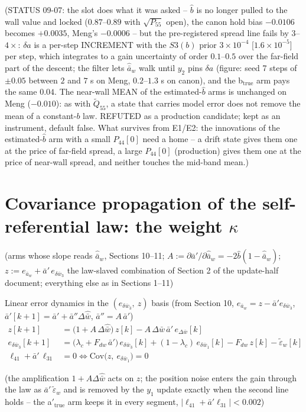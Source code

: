 \documentclass[11pt,a4paper,fontset=none]{ctexart}
\newcommand{\ba}{\bar{a}}
\newcommand{\bw}{\bar{w}}
\newcommand{\dWh}{\Delta\hat{\bw}}
\newcommand{\eD}{e_{\Delta\bw}}
\newcommand{\ap}{\ba'}
\newcommand{\app}{\ba''}
\newcommand{\et}{\tilde{\varepsilon}_w}
\begin{document}
(STATUS 09-07: the slot does what it was asked -- $\hat b$ is no longer pulled to the wall value and locked ($0.87$--$0.89$ with
$\sqrt{P_{55}}$ open), the canon hold bias $-0.0106$ becomes $+0.0035$, Meng's $-0.0006$ -- but the pre-registered spread line fails
by $3$--$4\times$: $\delta a$ is a per-step INCREMENT with the $S3(b)$ prior $3\times10^{-4}$ [$1.6\times10^{-5}$] per step, which integrates
to a gain uncertainty of order $0.1$--$0.5$ over the far-field part of the descent; the filter lets $\hat{\ba}_w$ walk until $y_2$ pins
$\delta a$ (figure: seed 7 steps of $\pm 0.05$ between $2$ and $7$ s on Meng, $0.2$--$1.3$ s on canon), and the b$_{\mathrm{true}}$ arm pays
the same $0.04$. The near-wall MEAN of the estimated-$\hat b$ arms is unchanged on Meng ($-0.010$): as with $\tilde Q_{55}$, a state
that carries model error does not remove the mean of a constant-$b$ law. REFUTED as a production candidate; kept as an instrument,
default false. What survives from E1/E2: the innovations of the estimated-$\hat b$ arm with a small $P_{44}[0]$ need a home -- a drift
state gives them one at the price of far-field spread, a large $P_{44}[0]$ (production) gives them one at the price of near-wall
spread, and neither touches the mid-band mean.)


\clearpage
\section{Covariance propagation of the self-referential law: the weight $\kappa$}

(arms whose slope reads $\hat{\ba}_w$, Sections 10--11; $A := \partial\ap/\partial\hat{\ba}_w = -2\hat{b}(1-\hat{\ba}_w)$;
$z := e_{\ba_w} + \ap\,e_{\delta\bw_3}$ the law-slaved combination of Section 2 of the update-half document;
everything else as in Sections 1--11)

Linear error dynamics in the $(e_{\delta\bw_3},\ z)$ basis (from Section 10, $e_{\ba_w} = z - \ap e_{\delta\bw_3}$, $\ap[k+1] = \ap + \app\dWh$, $\app = A\,\ap$)
\begin{align*}
z[k+1] &= \bigl(1 + A\,\dWh\bigr)\,z[k] - A\,\dWh\,\ap\,\eD[k] \\
e_{\delta\bw_3}[k+1] &= \bigl(\lambda_c + F_{dw}\,\ap\bigr)\,e_{\delta\bw_3}[k] + (1-\lambda_c)\,e_{\delta\bw_1}[k] - F_{dw}\,z[k] - \et[k] \\
\ell_{41} + \ap\,\ell_{31} &= 0 \iff \mathrm{Cov}\bigl(z,\ e_{\delta\bw_1}\bigr) = 0
\end{align*}

(the amplification $1 + A\dWh$ acts on $z$; the position noise enters the gain through the law as $\ap\,\et$ and is
removed by the $y_1$ update exactly when the second line holds -- the a$'_{\mathrm{true}}$ arm keeps it in every segment,
$|\ell_{41} + \ap\ell_{31}| < 0.002$)
\end{document}
